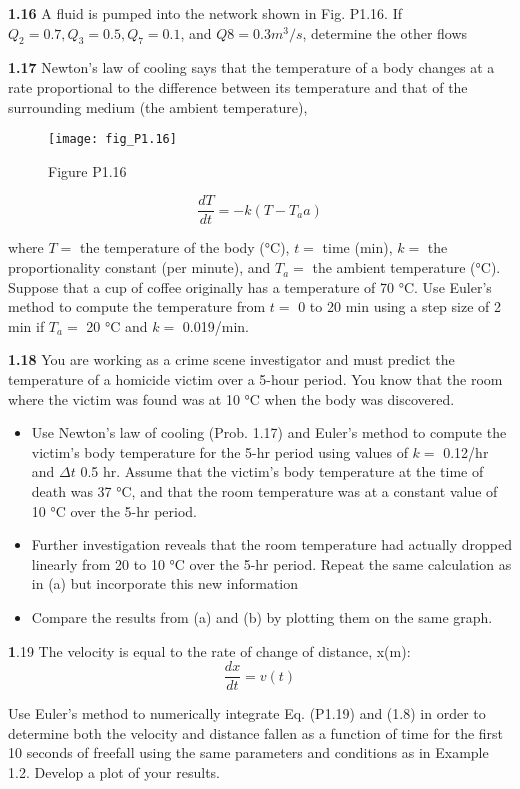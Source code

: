 \documentclass[../main.tex]{subfiles}
\begin{document}
\begin{multicols}{2}
\textbf{1.16} A fluid is pumped into the network shown in Fig. P1.16.
If $Q_2 = 0.7, Q_3 = 0.5, Q_7 = 0.1$, and $Q8 = 0.3 m^3/s$, determine
the other flows


\textbf{1.17} Newton's law of cooling says that the temperature of a
body changes at a rate proportional to the difference between
its temperature and that of the surrounding medium (the ambient temperature),
\begin{figure}[H]
	\centering
	\texttt{[image: fig\_P1.16]}
   \caption*{Figure P1.16}
   \label{fig_1.}
\end{figure}

$$\dfrac{dT}{dt}= -k(T -T_aa)$$

where $T =$ the temperature of the body (°C), $t =$ time (min),
$k =$ the proportionality constant (per minute), and $T_a =$ the
ambient temperature (°C). Suppose that a cup of coffee originally has a temperature of 70 °C. Use Euler's method to
compute the temperature from $t =$ 0 to 20 min using a step
size of 2 min if $T_a =$ 20 °C and $k =$ 0.019/min.

\textbf{1.18} You are working as a crime scene investigator and
must predict the temperature of a homicide victim over a
5-hour period. You know that the room where the victim was
found was at 10 °C when the body was discovered.
\begin{itemize}
	\item Use Newton's law of cooling (Prob. 1.17) and Euler's
	method to compute the victim's body temperature for
	the 5-hr period using values of $k=$  0.12/hr and $\Delta t$
	0.5 hr. Assume that the victim's body temperature at
	the time of death was 37 °C, and that the room temperature was at a constant value of 10 °C over the 5-hr
	period.
	\item Further investigation reveals that the room temperature
	had actually dropped linearly from 20 to 10 °C over the
	5-hr period. Repeat the same calculation as in (a) but incorporate this new information
	\item Compare the results from (a) and (b) by plotting them
	on the same graph. 
\end{itemize}

\textbf1.19 The velocity is equal to the rate of change of distance,
x(m):
$$\dfrac{dx}{dt} = v(t)$$


Use Euler's method to numerically integrate Eq. (P1.19) and
(1.8) in order to determine both the velocity and distance
fallen as a function of time for the first 10 seconds of freefall
using the same parameters and conditions as in Example 1.2.
Develop a plot of your results.


\end{multicols}
\end{document}
